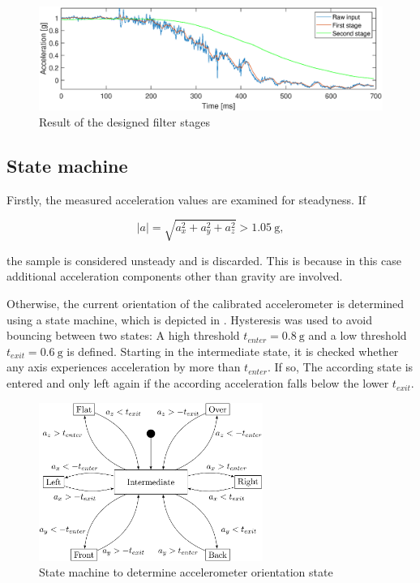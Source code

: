 \documentclass[a4paper, 12pt]{article}
\begin{document}
\begin{figure}[h!]
	\centering
	\includegraphics[width=\textwidth]{filters.eps}
	\caption{Result of the designed filter stages}
	\label{fig:filtering}
\end{figure}

\subsection{State machine}
Firstly, the measured acceleration values are examined for steadyness. If 

\begin{equation}
	|a| = \sqrt{a_x^2 + a_y^2 + a_z^2} > \SI{1.05}{\gram},
\end{equation}

the sample is considered unsteady and is discarded. This is because in this case additional acceleration components other than gravity are involved.

Otherwise, the current orientation of the calibrated accelerometer is determined using a state machine, which is depicted in . Hysteresis was used to avoid bouncing between two states: A high threshold $t_{enter} = \SI{0.8}{\gram}$ and a low threshold $t_{exit} = \SI{0.6}{\gram}$ is defined. Starting in the intermediate state, it is checked whether any axis experiences acceleration by more than $t_{enter}$. If so, The according state is entered and only left again if the according acceleration falls below the lower $t_{exit}$.

\begin{figure}[h!]
	\centering
	\includegraphics[width=0.65\textwidth]{stm.png}
	\caption{State machine to determine accelerometer orientation state}
	\label{fig:stm}
\end{figure}
\end{document}
